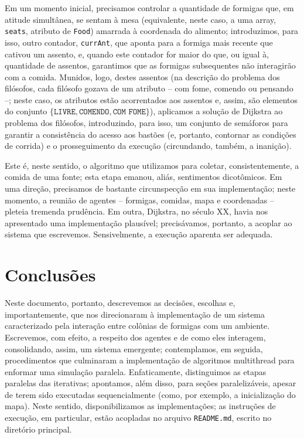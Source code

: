 \documentclass[12pt]{article}
\theoremstyle{definition}
\begin{document}
Em um momento inicial, precisamos controlar a quantidade de formigas que, em atitude simultânea, se sentam à mesa (equivalente, neste caso, a uma array, \texttt{seats}, atributo de \texttt{Food}) amarrada à coordenada do alimento; introduzimos, para isso, outro contador, \texttt{currAnt}, que aponta para a formiga mais recente que cativou um assento, e, quando este contador for maior do que, ou igual à, quantidade de assentos, garantimos que as formigas subsequentes não interagirão com a comida. Munidos, logo, destes assentos (na descrição do problema dos filósofos, cada filósofo gozava de um atributo -- com fome, comendo ou pensando --; neste caso, os atributos estão acorrentados aos assentos e, assim, são elementos do conjunto $\{\texttt{LIVRE}, \texttt{COMENDO}, \texttt{COM FOME}\}$), aplicamos a solução de Dijkstra ao problema dos filósofos, introduzindo, para isso, um conjunto de semáforos para garantir a consistência do acesso aos bastões (e, portanto, contornar as condições de corrida) e o prosseguimento da execução (circundando, também, a inanição). 

Este é, neste sentido, o algoritmo que utilizamos para coletar, consistentemente, a comida de uma fonte; esta etapa emanou, aliás, sentimentos dicotômicos. Em uma direção, precisamos de bastante circunspecção em sua implementação; neste momento, a reunião de agentes -- formigas, comidas, mapa e coordenadas -- pleteia tremenda prudência. Em outra, Dijkstra, no século XX, havia nos apresentado uma implementação plausível; precisávamos, portanto, a acoplar ao sistema que escrevemos. Sensivelmente, a execução aparenta ser adequada. 

\section{Conclusões} 

Neste documento, portanto, descrevemos as decisões, escolhas e, importantemente, que nos direcionaram à implementação de um sistema caracterizado pela interação entre colônias de formigas com um ambiente. Escrevemos, com efeito, a respeito dos agentes e de como eles interagem, consolidando, assim, um sistema emergente; contemplamos, em seguida, procedimentos que culminaram a implementação de algoritmos multithread para enformar uma simulação paralela. Enfaticamente, distinguimos as etapas paralelas das iterativas; apontamos, além disso, para seções paralelizáveis, apesar de terem sido executadas sequencialmente (como, por exemplo, a inicialização do mapa). Neste sentido, disponibilizamos as implementações; as instruções de execução, em particular, estão acopladas no arquivo \texttt{README.md}, escrito no diretório principal.   
\end{document}
